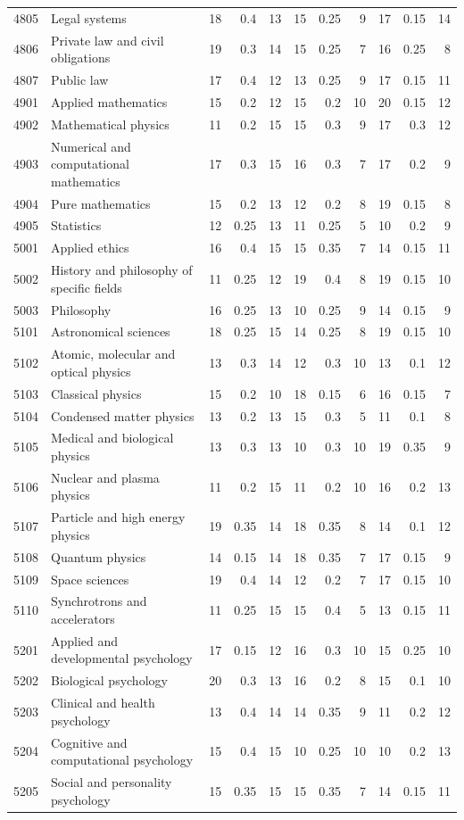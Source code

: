 \begin{longtable}{r p{2.15cm} rrr rrr rrr}
4805 & Legal systems & 18 & 0.4 & 13 & 15 & 0.25 & 9 & 17 & 0.15 & 14 \\
4806 & Private law and civil obligations & 19 & 0.3 & 14 & 15 & 0.25 & 7 & 16 & 0.25 & 8 \\
4807 & Public law & 17 & 0.4 & 12 & 13 & 0.25 & 9 & 17 & 0.15 & 11 \\
4901 & Applied mathematics & 15 & 0.2 & 12 & 15 & 0.2 & 10 & 20 & 0.15 & 12 \\
4902 & Mathematical physics & 11 & 0.2 & 15 & 15 & 0.3 & 9 & 17 & 0.3 & 12 \\
4903 & Numerical and computational mathematics & 17 & 0.3 & 15 & 16 & 0.3 & 7 & 17 & 0.2 & 9 \\
4904 & Pure mathematics & 15 & 0.2 & 13 & 12 & 0.2 & 8 & 19 & 0.15 & 8 \\
4905 & Statistics & 12 & 0.25 & 13 & 11 & 0.25 & 5 & 10 & 0.2 & 9 \\
5001 & Applied ethics & 16 & 0.4 & 15 & 15 & 0.35 & 7 & 14 & 0.15 & 11 \\
5002 & History and philosophy of specific fields & 11 & 0.25 & 12 & 19 & 0.4 & 8 & 19 & 0.15 & 10 \\
5003 & Philosophy & 16 & 0.25 & 13 & 10 & 0.25 & 9 & 14 & 0.15 & 9 \\
5101 & Astronomical sciences & 18 & 0.25 & 15 & 14 & 0.25 & 8 & 19 & 0.15 & 10 \\
5102 & Atomic, molecular and optical physics & 13 & 0.3 & 14 & 12 & 0.3 & 10 & 13 & 0.1 & 12 \\
5103 & Classical physics & 15 & 0.2 & 10 & 18 & 0.15 & 6 & 16 & 0.15 & 7 \\
5104 & Condensed matter physics & 13 & 0.2 & 13 & 15 & 0.3 & 5 & 11 & 0.1 & 8 \\
5105 & Medical and biological physics & 13 & 0.3 & 13 & 10 & 0.3 & 10 & 19 & 0.35 & 9 \\
5106 & Nuclear and plasma physics & 11 & 0.2 & 15 & 11 & 0.2 & 10 & 16 & 0.2 & 13 \\
5107 & Particle and high energy physics & 19 & 0.35 & 14 & 18 & 0.35 & 8 & 14 & 0.1 & 12 \\
5108 & Quantum physics & 14 & 0.15 & 14 & 18 & 0.35 & 7 & 17 & 0.15 & 9 \\
5109 & Space sciences & 19 & 0.4 & 14 & 12 & 0.2 & 7 & 17 & 0.15 & 10 \\
5110 & Synchrotrons and accelerators & 11 & 0.25 & 15 & 15 & 0.4 & 5 & 13 & 0.15 & 11 \\
5201 & Applied and developmental psychology & 17 & 0.15 & 12 & 16 & 0.3 & 10 & 15 & 0.25 & 10 \\
5202 & Biological psychology & 20 & 0.3 & 13 & 16 & 0.2 & 8 & 15 & 0.1 & 10 \\
5203 & Clinical and health psychology & 13 & 0.4 & 14 & 14 & 0.35 & 9 & 11 & 0.2 & 12 \\
5204 & Cognitive and computational psychology & 15 & 0.4 & 15 & 10 & 0.25 & 10 & 10 & 0.2 & 13 \\
5205 & Social and personality psychology & 15 & 0.35 & 15 & 15 & 0.35 & 7 & 14 & 0.15 & 11 \\

\end{longtable}
